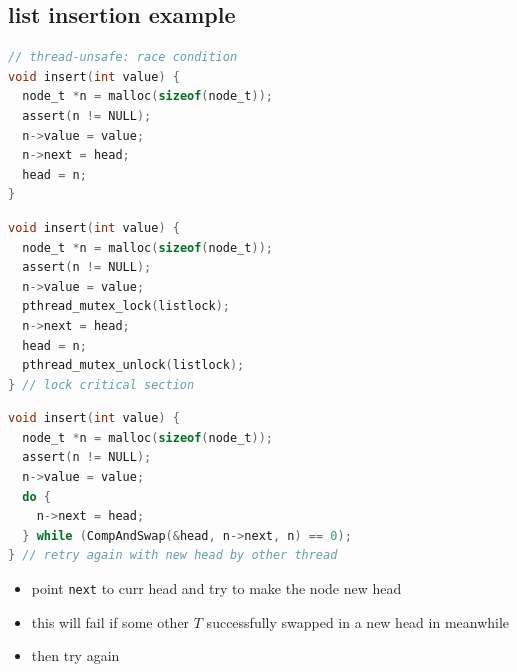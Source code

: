 \documentclass[8pt,a4paper,landscape]{extarticle}
\begin{document}
\begin{multicols*}{3}
\begin{minipage}{0.55\linewidth}
\section*{list insertion example}
\begin{lstlisting}[language=c,frame=none,xleftmargin=-6pt]
// thread-unsafe: race condition
void insert(int value) {
  node_t *n = malloc(sizeof(node_t));
  assert(n != NULL);
  n->value = value;
  n->next = head;
  head = n;
}
\end{lstlisting}
\end{minipage}
\begin{minipage}{0.5\linewidth}
\begin{lstlisting}[language=c,frame=none,xleftmargin=-18pt]
void insert(int value) {
  node_t *n = malloc(sizeof(node_t));
  assert(n != NULL);
  n->value = value;
  pthread_mutex_lock(listlock);
  n->next = head;
  head = n;
  pthread_mutex_unlock(listlock);
} // lock critical section
\end{lstlisting}
\end{minipage}
\begin{minipage}{0.68\linewidth}
\begin{lstlisting}[language=c]
void insert(int value) {
  node_t *n = malloc(sizeof(node_t));
  assert(n != NULL);
  n->value = value;
  do {
    n->next = head;
  } while (CompAndSwap(&head, n->next, n) == 0);
} // retry again with new head by other thread
\end{lstlisting}
\end{minipage}
\begin{minipage}{.32\linewidth}
  \flushleft
  \begin{itemize}
  \item point \texttt{next} to curr head and try to make the node new head
  \item this will fail if some other $T$ successfully swapped in a new head in meanwhile
  \item then try again
  \end{itemize}
\end{minipage}

\end{multicols*}
\end{document}
